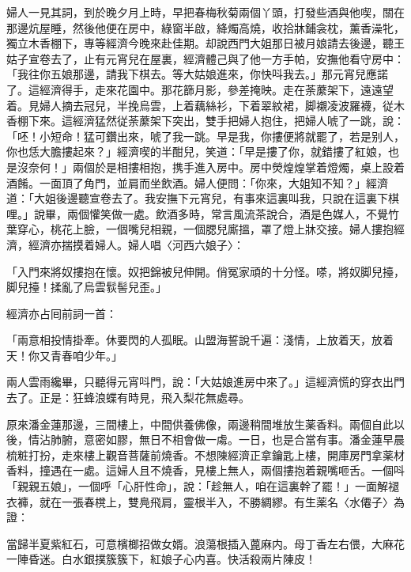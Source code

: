婦人一見其詞，到於晚夕月上時，早把春梅秋菊兩個丫頭，打發些酒與他喫，關在那邊炕屋睡，然後他便在房中，綠窗半啟，絳燭高燒，收拾牀鋪衾枕，薰香澡牝，獨立木香棚下，專等經濟今晚來赴佳期。却說西門大姐那日被月娘請去後邊，聽王姑子宣卷去了，止有元宵兒在屋裏，經濟體己與了他一方手帕，安撫他看守房中：「我往你五娘那邊，請我下棋去。等大姑娘進來，你快呌我去。」那元宵兒應諾了。這經濟得手，走來花園中。那花篩月影，參差掩映。走在荼䕷架下，遠遠望着。見婦人摘去冠兒，半挽烏雲，上着藕絲衫，下着翠紋裙，脚襯凌波羅襪，従木香棚下來。這經濟猛然従荼䕷架下突出，雙手把婦人抱住，把婦人唬了一跳，說：「呸！小短命！猛可鑽出來，唬了我一跳。早是我，你摟便將就罷了，若是别人，你也恁大膽摟起來？」經濟喫的半酣兒，笑道：「早是摟了你，就錯摟了紅娘，也是沒奈何！」兩個於是相摟相抱，携手進入房中。房中熒煌煌掌着燈燭，桌上設着酒餚。一面頂了角門，並肩而坐飲酒。婦人便問：「你來，大姐知不知？」經濟道：「大姐後邊聽宣卷去了。我安撫下元宵兒，有事來這裏叫我，只說在這裏下棋哩。」說畢，兩個懽笑做一處。飲酒多時，常言風流茶說合，酒是色媒人，不覺竹葉穿心，桃花上臉，一個嘴兒相親，一個腮兒廝搵，罩了燈上牀交接。婦人摟抱經濟，經濟亦揣摸着婦人。婦人唱〈河西六娘子〉：

\begin{myquote}
「入門來將奴摟抱在懷。奴把錦被兒伸開。俏冤家頑的十分怪。嗏，將奴脚兒擡，脚兒擡！揉亂了烏雲䯼髻兒歪。」
\end{myquote}

經濟亦占囘前詞一首：

\begin{myquote}
「兩意相投情掛牽。休要閃的人孤眠。山盟海誓說千遍：淺情，上放着天，放着天！你又青春咱少年。」
\end{myquote}

兩人雲雨纔畢，只聽得元宵呌門，說：「大姑娘進房中來了。」這經濟慌的穿衣出門去了。正是：狂蜂浪蝶有時見，飛入梨花無處尋。

原來潘金蓮那邊，三間樓上，中間供養佛像，兩邊稍間堆放生薬香料。兩個自此以後，情沾肺腑，意密如膠，無日不相會做一䖏。一日，也是合當有事。潘金蓮早晨梳粧打扮，走來樓上觀音菩薩前燒香。不想陳經濟正拿鑰匙上樓，開庫房門拿薬材香料，撞遇在一處。這婦人且不燒香，見樓上無人，兩個摟抱着親嘴咂舌。一個呌「親親五娘」，一個呼「心肝性命」，說：「趁無人，咱在這裏幹了罷！」一面解褪衣褲，就在一張春櫈上，雙鳧飛肩，靈根半入，不勝綢繆。有生薬名〈水僊子〉為證：

\begin{myquote}
當歸半夏紫紅石，可意檳榔招做女婿。浪蕩根插入蓖麻内。母丁香左右偎，大麻花一陣昏迷。白水銀撲簇簇下，紅娘子心内喜。快活殺兩片陳皮！
\end{myquote}


